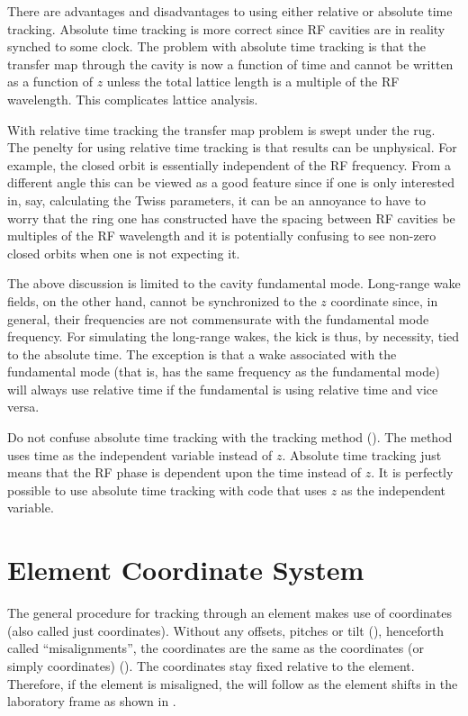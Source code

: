 There are advantages and disadvantages to using either relative or
absolute time tracking. Absolute time tracking is more correct since
RF cavities are in reality synched to some clock. The problem with
absolute time tracking is that the transfer map through the cavity is
now a function of time and cannot be written as a function of $z$
unless the total lattice length is a multiple of the RF wavelength.
This complicates lattice analysis.

With relative time tracking the transfer map problem is swept under
the rug. The penelty for using relative time tracking is that results
can be unphysical. For example, the closed orbit is essentially
independent of the RF frequency. From a different angle this can be
viewed as a good feature since if one is only interested in, say,
calculating the Twiss parameters, it can be an annoyance to have to
worry that the ring one has constructed have the spacing between RF
cavities be multiples of the RF wavelength and it is potentially
confusing to see non-zero closed orbits when one is not expecting it.

The above discussion is limited to the cavity fundamental mode.
Long-range wake fields, on the other hand, cannot be synchronized to
the $z$ coordinate since, in general, their frequencies are not
commensurate with the fundamental mode frequency. For simulating the
long-range wakes, the kick is thus, by necessity, tied to the absolute
time. The exception is that a wake associated with the fundamental
mode (that is, has the same frequency as the fundamental mode) will
always use relative time if the fundamental is using relative time and
vice versa.

Do not confuse absolute time tracking with the 
tracking method (). The  method uses
time as the independent variable instead of $z$. Absolute time
tracking just means that the RF phase is dependent upon the time
instead of $z$. It is perfectly possible to use absolute time
tracking with code that uses $z$ as the independent variable.

\section{Element Coordinate System}
\label{s:ele.coords}

The general procedure for tracking through an element makes use of
 coordinates (also called just 
coordinates). Without any offsets, pitches or tilt (), henceforth
called ``misalignments'', the  coordinates are the same
as the  coordinates (or simply 
coordinates) (). The  coordinates stay fixed
relative to the element. Therefore, if the element is misaligned, the
 will follow as the element shifts in the
laboratory frame as shown in .

